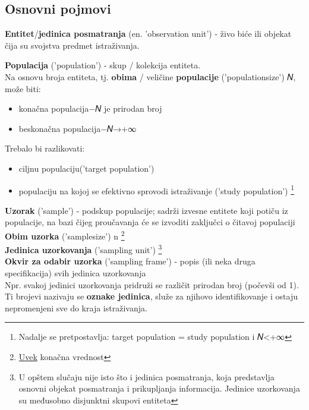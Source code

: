 \documentclass[10pt,a4paper,]{article}
\begin{document}
\subsection{Osnovni pojmovi}
\textbf{Entitet}/\textbf{jedinica posmatranja} (en. 'observation
unit') - živo biće ili objekat čija su svojstva predmet istraživanja.

\textbf{Populacija} ('population') - skup / kolekcija entiteta.
\\[0.1cm]
Na osnovu broja entiteta, tj. \textbf{obima} 
/ veličine \textbf{populacije} ('populationsize') 𝑁, može biti:
\begin{itemize}
           \item konačna populacija−𝑁 je prirodan broj
           \item beskonačna populacija−𝑁→+∞
\end{itemize}
Trebalo bi razlikovati:
\begin{itemize}
        \item ciljnu populaciju('target population')
        \item populaciju na kojoj se efektivno sprovodi 
           istraživanje ('study population')
           \footnote{Nadalje se pretpostavlja: 
           target population = study population i 𝑁<+∞}
\end{itemize}


\textbf{Uzorak} ('sample') - podskup populacije; sadrži izvesne entitete koji potiču iz populacije, na bazi čijeg proučavanja će se izvoditi zaključci o čitavoj populaciji
\\
\textbf{Obim uzorka} ('samplesize') n 
\footnote{\underline{Uvek} konačna vrednost} 
\\
\textbf{Jedinica uzorkovanja} ('sampling unit')
\footnote{U opštem slučaju nije isto što i jedinica posmatranja, koja 
predstavlja osnovni objekat posmatranja i prikupljanja informacija. 
Jedinice uzorkovanja su međusobno disjunktni skupovi entiteta}
\\
\textbf{Okvir za odabir uzorka} ('sampling frame') - popis (ili neka druga specifikacija) svih jedinica uzorkovanja
\\[0.25cm]
Npr. svakoj jedinici uzorkovanja pridruži se različit prirodan broj (počevši od 1). Ti brojevi nazivaju se \textbf{oznake jedinica},
služe za njihovo identifikovanje i ostaju nepromenjeni 
sve do kraja istraživanja.
\\
\end{document}
